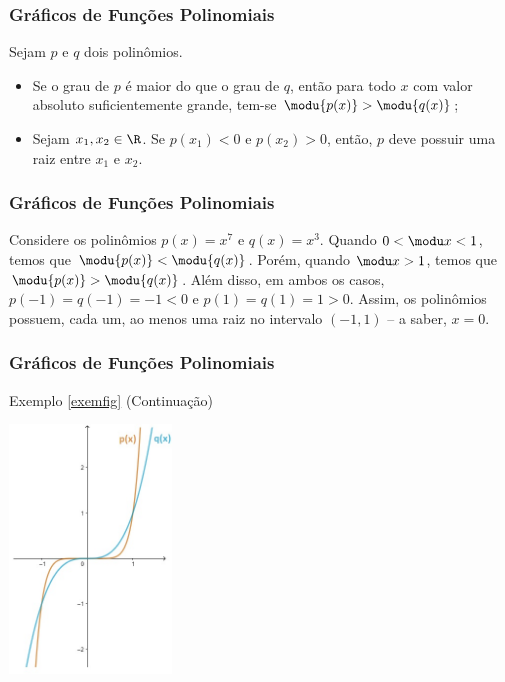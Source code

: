     \begin{frame}
    \frametitle{Gráficos de Funções Polinomiais} 
     Sejam $p$ e $q$ dois polinômios.
    
    \begin{itemize}
        \item Se o grau de $p$ é maior do
        que o grau de $q$, então para todo $x$ com valor absoluto
        suficientemente grande, tem-se $\modu {p(x)} > \modu{q(x)}$;
        \pause
        \item Sejam $x_1, x_2 \in \R$. Se $p(x_1) < 0$ e $p(x_2)>0$,
        então,
        $p$ deve possuir uma raiz entre $x_1$ e $x_2$.
    \end{itemize}
    
    \end{frame}
    
    \begin{frame}
    \frametitle{Gráficos de Funções Polinomiais} 
    \begin{exemplo}\label{exemfig}
    Considere os polinômios $p(x) = x^7 $ e $q(x)=x^3$. Quando $0< \modu
    x < 1$, temos que $\modu {p(x)} < \modu{q(x)}$. Porém, quando $
    \modu x > 1$, temos que $\modu {p(x)} > \modu{q(x)}$. Além disso, em
    ambos os casos, $p(-1) = q(-1) = -1 <0$ e $p(1) = q(1) = 1 >0$.
    Assim, os polinômios possuem, cada um, ao menos uma raiz no
    intervalo $(-1, 1)$ -- a saber, $x=0$.
    
    \end{exemplo}
    
    \end{frame}
    
    \begin{frame}
    \frametitle{Gráficos de Funções Polinomiais} 
    \begin{block}{Exemplo \ref{exemfig} (Continuação)}
    
    
    \begin{center}
    \includegraphics[width=4.3cm]{figures/2graf.jpg}
    \end{center}
    
    
    \end{block}
    
    \end{frame}
    
